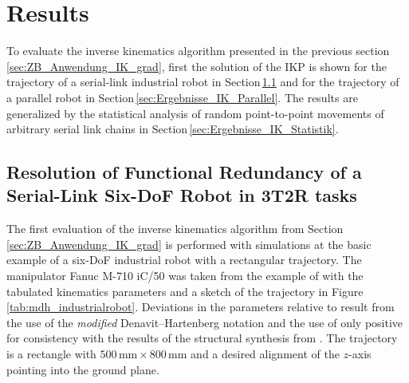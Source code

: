 \documentclass[robotics,article,accept,moreauthors,pdftex]{Definitions/mdpi}
\begin{document}
\section{Results}
\label{sec:Ergebnisse}

To evaluate the inverse kinematics algorithm presented in the previous section \ref{sec:ZB_Anwendung_IK_grad}, first the solution of the IKP is shown for the trajectory of a serial-link industrial robot in Section\,\ref{sec:Ergebnisse_Seriell} and for the trajectory of a parallel robot in Section\,\ref{sec:Ergebnisse_IK_Parallel}.
The results are generalized by the statistical analysis of random point-to-point movements of arbitrary serial link chains in Section\,\ref{sec:Ergebnisse_IK_Statistik}.

\subsection{Resolution of Functional Redundancy of a Serial-Link Six-DoF Robot in 3T2R tasks}
\label{sec:Ergebnisse_Seriell}


The first evaluation of the inverse kinematics algorithm from Section\,\ref{sec:ZB_Anwendung_IK_grad} is performed with simulations at the basic example of a six-DoF industrial robot with a rectangular trajectory.
The manipulator Fanuc M-710 iC/50 was taken from the example of \cite{HuoBar2008} with the tabulated kinematics parameters and a sketch of the trajectory in Figure\,\ref{tab:mdh_industrialrobot}.
Deviations in the parameters relative to \cite{HuoBar2008} result from the use of the \emph{modified}  Denavit--Hartenberg notation  and the use of only positive   for consistency with the results of the structural synthesis from \cite{RamirezKotOrt2015}.
The trajectory is a rectangle with $500\,\mathrm{mm} \times 800\,\mathrm{mm}$ and a desired alignment of the $z$-axis pointing into the ground plane.
\end{document}
